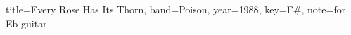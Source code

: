 \documentclass{skrul-leadsheet}
\begin{document}
\begin{song}[transpose-capo=true,transpose=1]{title={Every Rose Has Its Thorn}, band={Poison}, year={1988}, key={F#}, note={for Eb guitar}}

\end{song}
\end{document}
